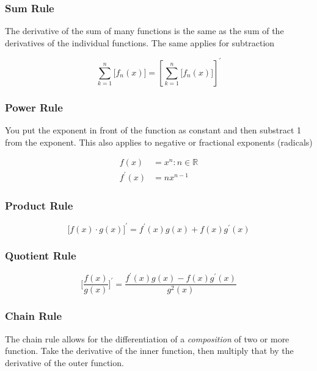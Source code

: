 \documentclass[12pt]{article}
\newcommand{\R}{{\mathbb{R}}}
\begin{document}
        \subsubsection{Sum Rule}

        The derivative of the sum of many functions is the same as the sum of the derivatives
        of the individual functions. The same applies for subtraction

        \[
            \sum_{k = 1}^n \bigg[f_n(x)\bigg] = \left[\sum_{k = 1}^n \bigg[f_n(x)\bigg]\right]^{\prime}
        \]

        \subsubsection{Power Rule}

        You put the exponent in front of the function as constant and then substract 1 from the exponent.
        This also applies to negative or fractional exponents (radicals)

        \[
            \begin{aligned}
                f(x) &= x^n : n \in \R \\
                f^{\prime}(x) &= nx^{n-1}
            \end{aligned}    
        \]

        \subsubsection{Product Rule}

        \[
            \bigg[f(x) \cdot g(x)\bigg]^{\prime} = f^{\prime}(x)g(x) + f(x)g^{\prime}(x)    
        \]

        \subsubsection{Quotient Rule} 

        \[
            \bigg[\frac{f(x)}{g(x)}\bigg]^{\prime} = \frac{f^{\prime}(x)g(x) - f(x)g^{\prime}(x)}{g^2(x)}    
        \]

        \subsubsection{Chain Rule}

        The chain rule allows for the differentiation of a \textit{composition} of two or more function. 
        Take the derivative of the inner function, then multiply that by the derivative of the outer function. 
\end{document}
